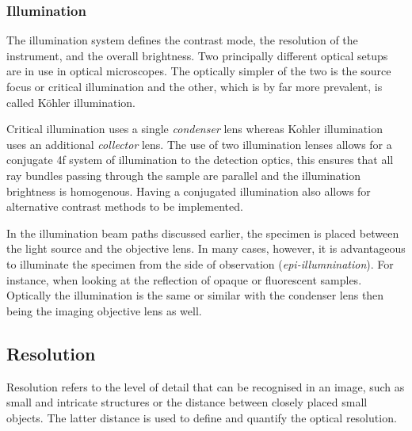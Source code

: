 \subsubsection{Illumination}

The illumination system defines the contrast mode, the resolution of the instrument, and the overall brightness.
Two principally different optical setups are in use in optical microscopes.
The optically simpler of the two is the source focus or critical illumination and the other, which is by far more prevalent, is called Köhler illumination.

Critical illumination uses a single \emph{condenser} lens whereas Kohler illumination uses an additional \emph{collector} lens.
The use of two illumination lenses allows for a conjugate \gls{4f}  system of illumination to the detection optics, this ensures that all ray bundles passing through the sample are parallel and the illumination brightness is homogenous.
Having a conjugated illumination also allows for alternative contrast methods to be implemented. %

In the illumination beam paths discussed earlier, the specimen is placed between the light source and the \gls{objective lens}.
In many cases, however, it is advantageous to illuminate the specimen from the side of observation (\emph{epi-illumnination}).
For instance, when looking at the reflection of opaque or fluorescent samples.
Optically the illumination is the same or similar with the condenser lens then being the imaging \gls{objective lens} as well.

\subsection{Resolution}

Resolution refers to the level of detail that can be recognised in an image, such as small and intricate structures or the distance between closely placed small objects.
The latter distance is used to define and quantify the optical resolution.

